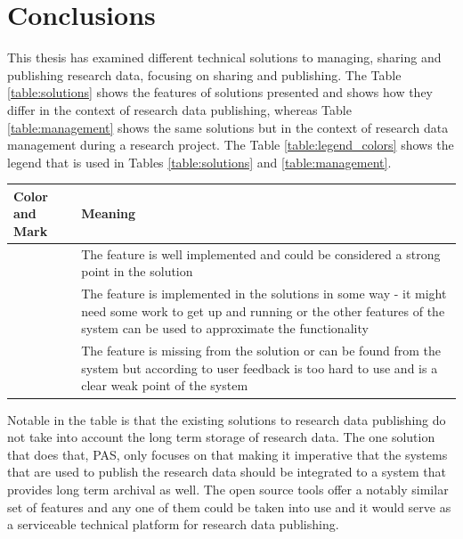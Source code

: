 \chapter{Conclusions}
\label{chapter:conclusions}

This thesis has examined different technical solutions to managing, sharing and
publishing research data, focusing on sharing and publishing. The Table
\ref{table:solutions} shows the features of solutions presented and shows
how they differ in the context of research data publishing, whereas Table
\ref{table:management} shows the same solutions but in the context of research
data management during a research project. The Table
\ref{table:legend_colors} shows the legend that is used in Tables
\ref{table:solutions} and \ref{table:management}.

\label{table:legend_colors}
    \begin{tabularx}{\textwidth}{| >{\raggedright}p{3cm} | X |}
    \hline
    \textbf{Color and Mark} & \textbf{Meaning} \\
    \hline
    \multicolumn{1}{|c|}{\cellcolor{green}++} & The feature is well implemented and could be considered a strong point
                          in the solution \\
    \hline
    \multicolumn{1}{|c|}{\cellcolor{yellow}+} & The feature is implemented in the solutions in some way - it might need
                          some work to get up and running or the other features of the system can be used to
                          approximate the functionality \\
    \hline
    \multicolumn{1}{|c|}{\cellcolor{red}-}    & The feature is missing from the solution or can be found from the system but according
                          to user feedback is too hard to use and is a clear weak point of the system \\
    \hline
\end{tabularx}


Notable in the table is that the existing solutions to research data publishing
do not take into account the long term storage of research data. The one
solution that does that, PAS, only focuses on that making it imperative that
the systems that are used to publish the research data should be integrated to
a system that provides long term archival as well. The open source tools offer
a notably similar set of features and any one of them could be taken into use
and it would serve as a serviceable technical platform for research data
publishing.

